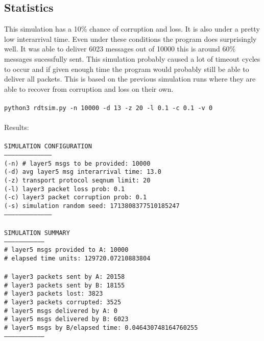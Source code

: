 \documentclass{article}
\begin{document}
\subsection{Statistics}
This simulation has a 10\% chance of corruption and loss. It is also under a
pretty low interarrival time. Even under these conditions the program does
surprisingly well. It was able to deliver 6023 messages out of 10000 this is
around 60\% messages sucessfully sent. This simulation probably caused a lot of
timeout cycles to occur and if given enough time the program would probably
still be able to deliver all packets. This is based on the previous simulation
runs where they are able to recover from corruption and loss on their own.
\\\\
\hspace*{10mm} \texttt{python3 rdtsim.py -n 10000 -d 13 -z 20 -l 0.1 -c 0.1 -v 0}\\\\
Results: \\
\texttt{\\
SIMULATION CONFIGURATION\\
--------------------------------------\\
(-n) \# layer5 msgs to be provided:      10000\\
(-d) avg layer5 msg interarrival time:  13.0\\
(-z) transport protocol seqnum limit:   20\\
(-l) layer3 packet loss prob:           0.1\\
(-c) layer3 packet corruption prob:     0.1\\
(-s) simulation random seed:            1713808377510185247\\
--------------------------------------\\
\\
SIMULATION SUMMARY\\
--------------------------------\\
\# layer5 msgs provided to A:      10000\\
\# elapsed time units:             129720.07210883804\\
\\
\# layer3 packets sent by A:       20158\\
\# layer3 packets sent by B:       18155\\
\# layer3 packets lost:            3823\\
\# layer3 packets corrupted:       3525\\
\# layer5 msgs delivered by A:     0\\
\# layer5 msgs delivered by B:     6023\\
\# layer5 msgs by B/elapsed time:  0.046430748164760255\\
--------------------------------\\}
\end{document}
